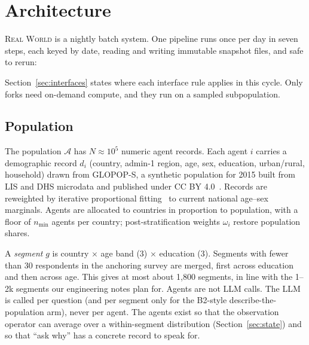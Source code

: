 \documentclass[11pt]{article}
\newcommand{\RW}{\textsc{Real World}}
\begin{document}
\section{Architecture}\label{sec:arch}

\RW{} is a nightly batch system. One pipeline runs once per day in seven steps, each keyed by date, reading and writing immutable snapshot files, and safe to rerun:
\begin{center}
\end{center}
Section~\ref{sec:interfaces} states where each interface rule applies in this cycle. Only forks need on-demand compute, and they run on a sampled subpopulation.

\subsection{Population}\label{sec:pop}
The population $\mathcal{A}$ has $N\approx 10^5$ numeric agent records. Each agent $i$ carries a demographic record $d_i$ (country, admin-1 region, age, sex, education, urban/rural, household) drawn from GLOPOP-S, a synthetic population for 2015 built from LIS and DHS microdata and published under CC BY 4.0~\citep{ton2024glopop}. Records are reweighted by iterative proportional fitting~\citep{deming1940least} to current national age--sex marginals. Agents are allocated to countries in proportion to population, with a floor of $n_{\min}$ agents per country; post-stratification weights $\omega_i$ restore population shares.

A \emph{segment} $g$ is country $\times$ age band (3) $\times$ education (3). Segments with fewer than 30 respondents in the anchoring survey are merged, first across education and then across age. This gives at most about 1,800 segments, in line with the 1--2k segments our engineering notes plan for. Agents are not LLM calls. The LLM is called per question (and per segment only for the B2-style describe-the-population arm), never per agent. The agents exist so that the observation operator can average over a within-segment distribution (Section~\ref{sec:state}) and so that ``ask why'' has a concrete record to speak for.
\end{document}
